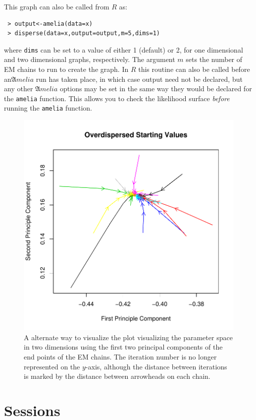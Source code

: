 \documentclass[12pt,titlepage]{article}
\newcommand{\Amelia}{\ensuremath{\mathfrak Amelia} }
\begin{document}
This graph can also be called from $R$ as:
\begin{verbatim}
 > output<-amelia(data=x) 
 > disperse(data=x,output=output,m=5,dims=1)
\end{verbatim}
where \texttt{dims} can be set to a value of either 1 (default) or 2,
for one dimensional and two dimensional graphs, respectively.  The
argument $m$ sets the number of EM chains to run to create the graph.
In $R$ this routine can also be called before an\Amelia run has taken
place, in which case output need not be declared, but any other \Amelia
options may be set in the same way they would be declared for the
\texttt{amelia} function.  This allows you to check the likelihood surface
\emph{before} running the \texttt{amelia} function.
\begin{figure}
  \centering \includegraphics[scale=.7]{overdis2d}
  \caption{ A alternate way to visualize the plot visualizing the
    parameter space in two dimensions using the first two principal
    components of the end points of the EM chains.  The iteration
    number is no longer represented on the $y$-axis, although the
    distance between iterations is marked by the distance between
    arrowheads on each chain.}

\end{figure}

\section{Sessions}
\label{sec:sessions}
\end{document}
